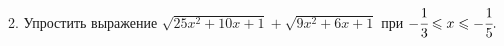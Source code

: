 2. Упростить выражение $\sqrt{25x^2+10x+1}+\sqrt{9x^2+6x+1}$ при $-\cfrac{1}{3}\leqslant x\leqslant-\cfrac{1}{5}.$\\
